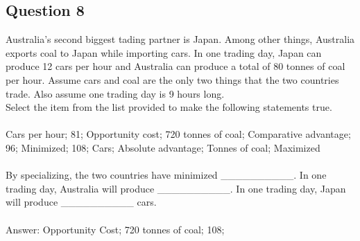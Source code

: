 \subsection{Question 8}
Australia's second biggest tading partner is Japan. Among other things, Australia exports coal to Japan while importing cars. In one trading day, Japan can produce 12 cars per hour and Australia can produce a total of 80 tonnes of coal per hour. Assume cars and coal are the only two things that the two countries trade. Also assume one trading day is 9 hours long.\\
Select the item from the list provided to make the following statements true.\\\\
Cars per hour; 81; Opportunity cost; 720 tonnes of coal; Comparative advantage; 96; Minimized; 108; Cars; Absolute advantage; Tonnes of coal; Maximized\\\\
By specializing, the two countries have minimized \_\_\_\_\_\_\_\_\_\_. In one trading day, Australia will produce \_\_\_\_\_\_\_\_\_\_. In one trading day, Japan will produce \_\_\_\_\_\_\_\_\_\_ cars.\\\\
Answer: Opportunity Cost; 720 tonnes of coal; 108;

